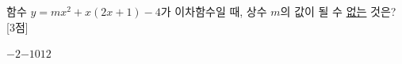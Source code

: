 함수 $y=mx^2+x(2x+1)-4$가 이차함수일 때, 상수 $m$의 값이 될 수 \underline{없는} 것은? \mbox{[3점]}
\begin{choices32}{$-2$}{$-1$}{$0$}{$1$}{$2$}\end{choices32}

